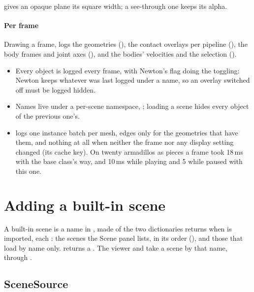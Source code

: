  gives an opaque plane its square width; a see-through one keeps its alpha.

\paragraph{Per frame} Drawing a frame,  logs the geometries (), the contact overlays per pipeline (), the body frames and joint axes (), and the bodies' velocities and the selection ().

\begin{itemize}
\item Every object is logged every frame, with Newton's  flag doing the toggling: Newton keeps whatever was last logged under a name, so an overlay switched off must be logged hidden.
\item Names live under a per-scene namespace, ; loading a scene hides every object of the previous one's.
\item {} logs one instance batch per mesh, edges only for the geometries that have them, and nothing at all when neither the frame nor any display setting changed (its cache key). On twenty armadillos as pieces a frame took 18\,ms with the base class's way, and 10\,ms while playing and 5 while paused with this one.
\end{itemize}

\section{Adding a built-in scene}\label{sec:add}

A built-in scene is a name in , made of the two dictionaries  returns when  is imported, each : the scenes the Scene panel lists, in its order (), and those that load by name only.  returns a . The viewer and  take a scene by that name, through .

\subsection{SceneSource}\label{sec:source}

